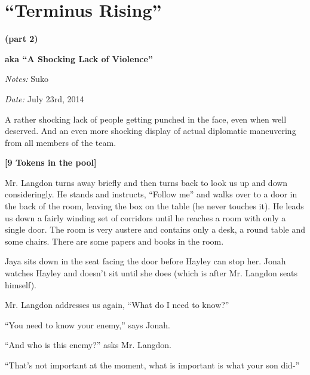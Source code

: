 \setcounter{chapter}{ 27 }
\chapter{\textbf{``Terminus Rising''} }




\begin{center}
 {\LARGE \textbf{(part 2)} } 
\end{center}


\begin{center}
 {\LARGE \textbf{aka ``A Shocking Lack of Violence''} } 
\end{center}




\textit{Notes:} Suko

\textit{Date:} July 23rd, 2014



A rather shocking lack of people getting punched in the face, even when well deserved.  And an even more shocking display of actual diplomatic maneuvering from all members of the team.



\noindent\hrulefill





\textbf{{[}9 Tokens in the pool{]}}



Mr. Langdon turns away briefly and then turns back to look us up and down consideringly.  He stands and instructs, ``Follow me'' and walks over to a door in the back of the room, leaving the box on the table (he never touches it).  He leads us down a fairly winding set of corridors until he reaches a room with only a single door.  The room is very austere and contains only a desk, a round table and some chairs.  There are some papers and books in the room.



Jaya sits down in the seat facing the door before Hayley can stop her.  Jonah watches Hayley and doesn't sit until she does (which is after Mr. Langdon seats himself).



Mr. Langdon addresses us again, ``What do I need to know?''

``You need to know your enemy,'' says Jonah.

``And who is this enemy?'' asks Mr. Langdon.

``That's not important at the moment, what is important is what your son did-''

